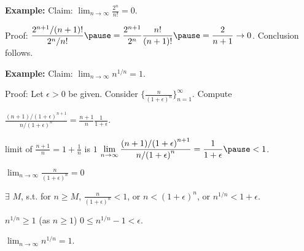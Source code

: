 \documentclass[10pt,aspectratio=149]{beamer}
\begin{document}
\begin{frame}

\textbf{Example:}
Claim:
$\displaystyle
\lim_{n\to\infty} \frac{2^n}{n!} = 0$.

\pause
\medskip

Proof:
\quad
$\displaystyle
\frac{2^{n+1} / (n+1)!}{2^n/n!}
\pause
=
\frac{2^{n+1}}{2^n}\frac{n!}{(n+1)!}
\pause
=
\frac{2}{n+1} \to 0$.
\pause
\quad Conclusion follows.

\pause
\medskip

\textbf{Example:}
Claim:
$\displaystyle
\lim_{n\to\infty} n^{1/n} = 1$.

\pause
Proof:
Let $\epsilon > 0$ be given. 
\pause
Consider
$\bigl\{ \frac{n}{{(1+\epsilon)}^n} \bigr\}_{n=1}^\infty$.
\pause
Compute

\quad
$\displaystyle
\frac{(n+1)/{(1+\epsilon)}^{n+1}}{n/{(1+\epsilon)}^{n}}
=
\frac{n+1}{n} \frac{1}{1+\epsilon} .
$

\pause
\medskip

limit of $\frac{n+1}{n} = 1+\frac{1}{n}$ is $1$
\pause
\wthus
$\displaystyle
\lim_{n\to \infty} \frac{(n+1)/{(1+\epsilon)}^{n+1}}{n/{(1+\epsilon)}^{n}}
=
\frac{1}{1+\epsilon}  \pause < 1$.

\pause
\medskip

\thus 
\quad
$\displaystyle \lim_{n\to\infty} \frac{n}{{(1+\epsilon)}^n} = 0$

\pause
\thus \quad
$\exists$ $M$, s.t. for $n \geq M$,
$\frac{n}{{(1+\epsilon)}^n} < 1$,
\pause
\quad or \quad
$n < {(1+\epsilon)}^n$,
\pause
\quad or \quad
$n^{1/n} < 1+\epsilon$.

\pause
\medskip

$n^{1/n} \geq 1$ (as $n \geq 1$)
\pause
\wthus
$0 \leq n^{1/n}-1 < \epsilon$.

\pause
\medskip

\thus \quad
$\displaystyle \lim_{n\to\infty} n^{1/n} = 1$.

\end{frame}

%
%
%
%
\end{document}
